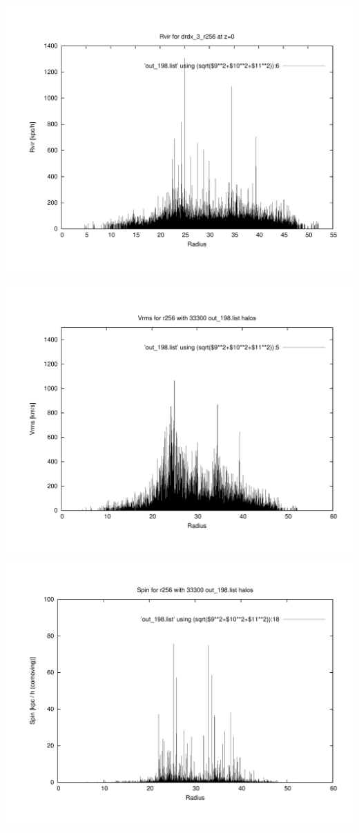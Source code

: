 \includegraphics[scale=0.3]{drdx_3_r256/plot_rvir_z0.pdf}

\includegraphics[scale=0.3]{drdx_3_r256/plot_Vrms_out_198.pdf}
\includegraphics[scale=0.3]{drdx_3_r256/plot_spin_out_198.pdf}

